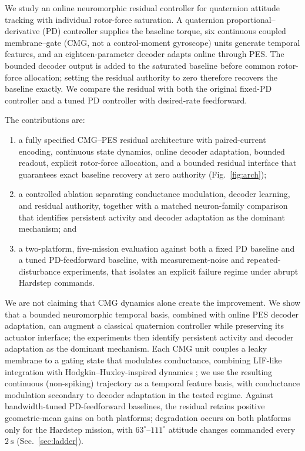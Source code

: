 \documentclass[letterpaper, 10 pt, conference]{ieeeconf}
\begin{document}
We study an online neuromorphic residual controller for quaternion attitude
tracking with individual rotor-force saturation. A quaternion
proportional--derivative (PD) controller supplies the baseline torque, six
continuous coupled membrane--gate (CMG, not a control-moment gyroscope) units generate temporal features, and
an eighteen-parameter decoder adapts online through PES. The bounded decoder
output is added to the saturated baseline before common rotor-force allocation;
setting the residual authority to zero therefore recovers the baseline exactly.
We compare the residual with both the original fixed-PD controller and a
tuned PD controller with desired-rate feedforward.

The contributions are:
\begin{enumerate}
    \item a fully specified CMG--PES residual architecture with paired-current
    encoding, continuous state dynamics, online decoder adaptation, bounded
    readout, explicit rotor-force allocation, and a bounded residual
    interface that guarantees exact baseline recovery at zero authority
    (Fig.~\ref{fig:arch});
    \item a controlled ablation separating conductance modulation, decoder
    learning, and residual authority, together with a matched neuron-family
    comparison that identifies persistent activity and decoder adaptation as
    the dominant mechanism; and
    \item a two-platform, five-mission evaluation against both a fixed PD
    baseline and a tuned PD-feedforward baseline, with measurement-noise and
    repeated-disturbance experiments, that isolates an explicit failure
    regime under abrupt Hardstep commands.
\end{enumerate}

We are not claiming that CMG dynamics alone create the improvement. We show that a bounded neuromorphic temporal basis, combined with online PES decoder adaptation, can augment a classical quaternion controller while preserving its actuator interface; the experiments then identify persistent activity and decoder adaptation as the dominant mechanism. Each CMG unit couples a leaky membrane to a gating state that modulates conductance, combining LIF-like integration with Hodgkin--Huxley-inspired dynamics \cite{hodgkin1952quantitative}; we use the resulting continuous (non-spiking) trajectory as a temporal feature basis, with conductance modulation secondary to decoder adaptation in the tested regime.
Against bandwidth-tuned PD-feedforward baselines, the residual retains positive geometric-mean gains on both platforms; degradation occurs on both platforms only for the Hardstep mission, with $63^\circ$--$111^\circ$ attitude changes commanded every $2~\mathrm{s}$ (Sec.~\ref{sec:ladder}).
\end{document}

